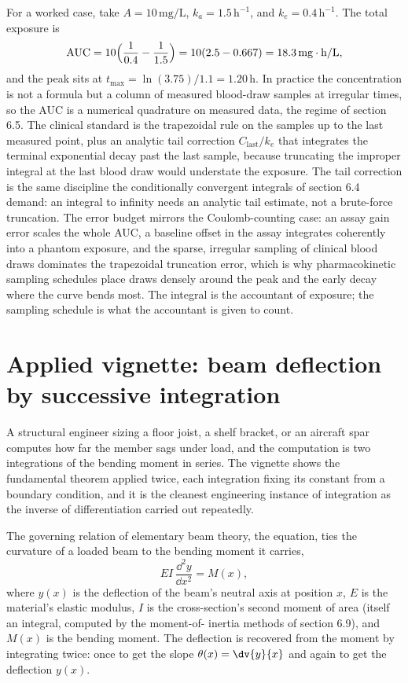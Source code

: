For a worked case, take $A = 10\,\text{mg/L}$, $k_{a} = 1.5\,\text{h}
^{-1}$, and $k_{e} = 0.4\,\text{h}^{-1}$. The total exposure is
\[
\mathrm{AUC} = 10\Bigl(\frac{1}{0.4} - \frac{1}{1.5}\Bigr) =
10(2.5 - 0.667) = 18.3\,\text{mg}\cdot\text{h}/\text{L},
\]
and the peak sits at $t_{\max} = \ln(3.75)/1.1 = 1.20\,\text{h}$. In
practice the concentration is not a formula but a column of measured
blood-draw samples at irregular times, so the AUC is a numerical
quadrature on measured data, the regime of section 6.5. The clinical
standard is the trapezoidal rule on the samples up to the last measured
point, plus an analytic tail correction $C_{\mathrm{last}}/k_{e}$ that
integrates the terminal exponential decay past the last sample, because
truncating the improper integral at the last blood draw would understate
the exposure. The tail correction is the same discipline the
conditionally convergent integrals of section 6.4 demand: an integral to
infinity needs an analytic tail estimate, not a brute-force truncation.
The error budget mirrors the Coulomb-counting case: an assay gain error
scales the whole AUC, a baseline offset in the assay integrates
coherently into a phantom exposure, and the sparse, irregular sampling of
clinical blood draws dominates the trapezoidal truncation error, which is
why pharmacokinetic sampling schedules place draws densely around the
peak and the early decay where the curve bends most. The integral is the
accountant of exposure; the sampling schedule is what the accountant is
given to count.

\section{Applied vignette: beam deflection by successive
integration}

A structural engineer sizing a floor joist, a shelf bracket, or an
aircraft spar computes how far the member sags under load, and the
computation is two integrations of the bending moment in series. The
vignette shows the fundamental theorem applied twice, each integration
fixing its constant from a boundary condition, and it is the cleanest
engineering instance of integration as the inverse of differentiation
carried out repeatedly.

The governing relation of elementary beam theory, the
 equation, ties the curvature of a loaded beam
to the bending moment it carries,
\[
EI\,\frac{\dd^{2}y}{\dd x^{2}} = M(x),
\]
where $y(x)$ is the deflection of the beam's neutral axis at position
$x$, $E$ is the material's elastic modulus, $I$ is the cross-section's
second moment of area (itself an integral, computed by the moment-of-
inertia methods of section 6.9), and $M(x)$ is the bending moment. The
deflection is recovered from the moment by integrating twice: once to get
the slope $\theta(x) = \dv{y}{x}$ and again to get the deflection $y(x)$.

